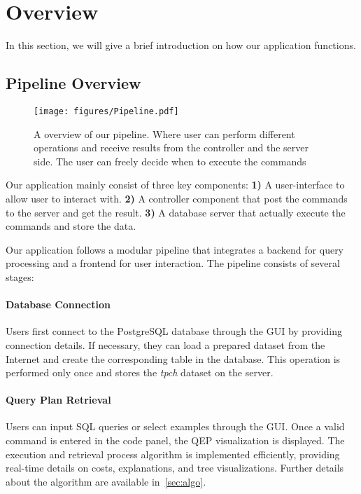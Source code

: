 \section{Overview}
\label{sec:overv}

In this section, we will give a brief introduction on how our application functions.

\subsection{Pipeline Overview}

\begin{figure}
    \centering
    \texttt{[image: figures/Pipeline.pdf]}
    \caption{A overview of our pipeline. Where user can perform different operations and receive results from the controller and the server side. The user can freely decide when to execute the commands}
    \label{fig:pipeline}
\end{figure}

Our application mainly consist of three key components: \textbf{1)} A user-interface to allow user to interact with. \textbf{2)} A controller component that post the commands to the server and get the result. \textbf{3)} A database server that actually execute the commands and store the data.

Our application follows a modular pipeline that integrates a backend for query processing and a frontend for user interaction. The pipeline consists of several stages:

\paragraph{Database Connection} Users first connect to the PostgreSQL database through the GUI by providing connection details. If necessary, they can load a prepared dataset from the Internet and create the corresponding table in the database. This operation is performed only once and stores the \textit{tpch} dataset on the server.

\paragraph{Query Plan Retrieval} Users can input SQL queries or select examples through the GUI. Once a valid command is entered in the code panel, the QEP visualization is displayed. The execution and retrieval process algorithm is implemented efficiently, providing real-time details on costs, explanations, and tree visualizations. Further details about the algorithm are available in~\cref{sec:algo}.

